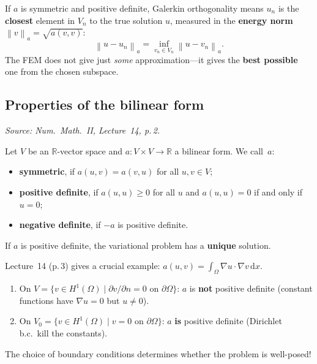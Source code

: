 \documentclass[11pt,a4paper]{article}
\theoremstyle{plain}
\theoremstyle{remark}
\newcommand{\R}{\mathbb{R}}
\newcommand{\norm}[1]{\left\| #1 \right\|}
\newcommand{\dx}{\,\mathrm{d}x}
\newcommand{\Vn}{V_n}
\newcommand{\un}{u_n}
\newcommand{\vn}{v_n}
\let\origsubsection\subsection
\renewcommand{\subsection}{\needspace{6\baselineskip}\origsubsection}
\begin{document}
\begin{intuition}
If $a$ is symmetric and positive definite, Galerkin orthogonality means
$\un$ is the \textbf{closest} element in $\Vn$ to the true solution $u$,
measured in the \textbf{energy norm}
$\norm{v}_a = \sqrt{a(v,v)}$:
\[
  \norm{u - \un}_a
  = \inf_{\vn \in \Vn} \norm{u - \vn}_a.
\]
The FEM does not give just \emph{some} approximation---it gives the
\textbf{best possible} one from the chosen subspace.
\end{intuition}

\subsection{Properties of the bilinear form}

\textit{Source: Num.\ Math.\ II, Lecture~14, p.\,2.}

\begin{definition}
Let $V$ be an $\R$-vector space and $a : V \times V \to \R$ a bilinear
form.  We call~$a$:
\begin{itemize}[nosep]
  \item \textbf{symmetric}, if $a(u,v) = a(v,u)$ for all $u,v \in V$;
  \item \textbf{positive definite}, if $a(u,u) \geq 0$ for all $u$
        and $a(u,u) = 0$ if and only if $u = 0$;
  \item \textbf{negative definite}, if $-a$ is positive definite.
\end{itemize}
If $a$ is positive definite, the variational problem has a
\textbf{unique} solution.
\end{definition}

\begin{warning}
Lecture~14 (p.\,3) gives a crucial example:
$a(u,v) = \int_\Omega \nabla u \cdot \nabla v\dx$.
\begin{enumerate}[nosep]
  \item On $V = \{v \in H^1(\Omega) \mid \partial v/\partial n = 0
        \text{ on } \partial\Omega\}$:
        $a$ is \textbf{not} positive definite
        (constant functions have $\nabla u = 0$ but $u \neq 0$).
  \item On $V_0 = \{v \in H^1(\Omega) \mid v = 0
        \text{ on } \partial\Omega\}$:
        $a$ \textbf{is} positive definite
        (Dirichlet b.c.\ kill the constants).
\end{enumerate}
The choice of boundary conditions determines whether the problem is
well-posed!
\end{warning}
\end{document}
